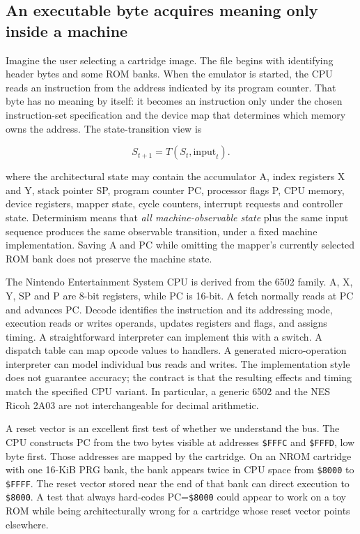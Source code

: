 \subsection{An executable byte acquires meaning only inside a machine}\label{06-engine-ii-ch042-an-executable-byte-acquires-meaning-only-inside-a-machine}

\hypertarget{06-engine-ii-ch042-an-executable-byte-acquires-meaning-only-inside-a-machine}{}

Imagine the user selecting a cartridge image. The file begins with identifying header bytes and some ROM banks. When the emulator is started, the CPU reads an instruction from the address indicated by its program counter. That byte has no meaning by itself: it becomes an instruction only under the chosen instruction-set specification and the device map that determines which memory owns the address. The state-transition view is

\[
S_{t+1}=T(S_t,\mathrm{input}_t).
\]

where the architectural state may contain the accumulator A, index registers X and Y, stack pointer SP, program counter PC, processor flags P, CPU memory, device registers, mapper state, cycle counters, interrupt requests and controller state. Determinism means that \emph{all machine-observable state} plus the same input sequence produces the same observable transition, under a fixed machine implementation. Saving A and PC while omitting the mapper's currently selected ROM bank does not preserve the machine state.

The Nintendo Entertainment System CPU is derived from the 6502 family. A, X, Y, SP and P are 8-bit registers, while PC is 16-bit. A fetch normally reads at PC and advances PC. Decode identifies the instruction and its addressing mode, execution reads or writes operands, updates registers and flags, and assigns timing. A straightforward interpreter can implement this with a switch. A dispatch table can map opcode values to handlers. A generated micro-operation interpreter can model individual bus reads and writes. The implementation style does not guarantee accuracy; the contract is that the resulting effects and timing match the specified CPU variant. In particular, a generic 6502 and the NES Ricoh 2A03 are not interchangeable for decimal arithmetic.

A reset vector is an excellent first test of whether we understand the bus. The CPU constructs PC from the two bytes visible at addresses \texttt{\$FFFC} and \texttt{\$FFFD}, low byte first. Those addresses are mapped by the cartridge. On an NROM cartridge with one 16-KiB PRG bank, the bank appears twice in CPU space from \texttt{\$8000} to \texttt{\$FFFF}. The reset vector stored near the end of that bank can direct execution to \texttt{\$8000}. A test that always hard-codes PC=\texttt{\$8000} could appear to work on a toy ROM while being architecturally wrong for a cartridge whose reset vector points elsewhere.

